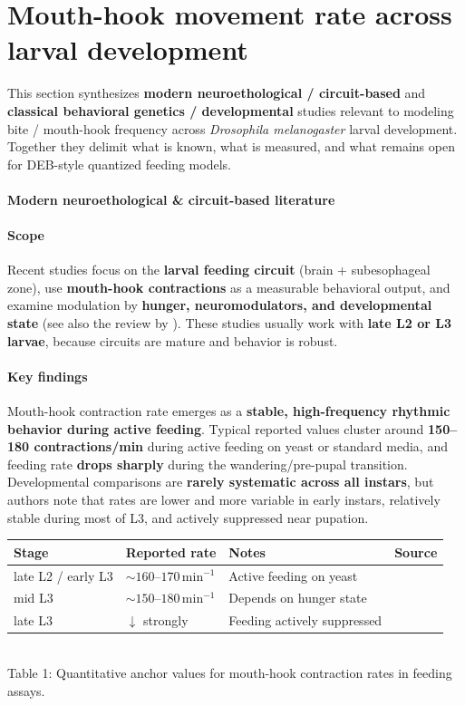 \documentclass[11pt]{article}
\begin{document}
\section*{Mouth-hook movement rate across larval development}

This section synthesizes \textbf{modern neuroethological / circuit-based} and \textbf{classical behavioral genetics / developmental} studies relevant to modeling bite / mouth-hook frequency across \textit{Drosophila melanogaster} larval development. Together they delimit what is known, what is measured, and what remains open for DEB-style quantized feeding models.

\paragraph{Modern neuroethological \& circuit-based literature}

\paragraph{Scope}
Recent studies focus on the \textbf{larval feeding circuit} (brain + subesophageal zone), use \textbf{mouth-hook contractions} as a measurable behavioral output, and examine modulation by \textbf{hunger, neuromodulators, and developmental state} (see also the review by \citet{miroschnikow2020curbio}). These studies usually work with \textbf{late L2 or L3 larvae}, because circuits are mature and behavior is robust.

\paragraph{Key findings}
Mouth-hook contraction rate emerges as a \textbf{stable, high-frequency rhythmic behavior during active feeding}. Typical reported values cluster around \textbf{150--180 contractions/min} during active feeding on yeast or standard media, and feeding rate \textbf{drops sharply} during the wandering/pre-pupal transition. Developmental comparisons are \textbf{rarely systematic across all instars}, but authors note that rates are lower and more variable in early instars, relatively stable during most of L3, and actively suppressed near pupation.

\begin{table}[h]
\centering
\begin{tabular}{llll}
\toprule
Stage & Reported rate & Notes & Source \\
\midrule
late L2 / early L3 & $\sim 160\text{--}170\,\text{min}^{-1}$ & Active feeding on yeast & \citep{bhatt2013jove} \\
mid L3 & $\sim 150\text{--}180\,\text{min}^{-1}$ & Depends on hunger state & \citep{schoofs2018jinsphys} \\
late L3 & $\downarrow$ strongly & Feeding actively suppressed & \citep{melcher2005plosbio} \\
\bottomrule
\end{tabular}
\\[0.5em]
Table 1: Quantitative anchor values for mouth-hook contraction rates in feeding assays.
\end{table}
\end{document}

